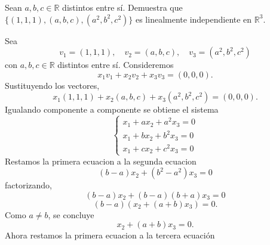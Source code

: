\documentclass[12pt,a4paper]{article}
\begin{document}
    \begin{mdframed}[style=mdbluebox,frametitle={Ejercicio 5}]
        Sean $a,b,c\in\mathbb{R}$ distintos entre sí. Demuestra que
        $\{(1,1,1),(a,b,c),(a^{2},b^{2},c^{2})\}$ es linealmente independiente
        en $\mathbb{R}^{3}$.
    \end{mdframed}

    \begin{solucion}
        Sea
        \begin{equation*}
            v_{1}=(1,1,1),\quad v_{2}=(a,b,c), \quad v_{3}=(a^{2},b^{2},c^{2})
        \end{equation*}
        con $a,b,c\in\mathbb{R}$ distintos entre sí. Consideremos
        \begin{equation*}
            x_{1}v_{1}+x_{2}v_{2}+x_{3}v_{3}=(0,0,0).
        \end{equation*}
        Sustituyendo los vectores,
        \begin{equation*}
            x_{1}(1,1,1)+x_{2}(a,b,c)+x_{3}(a^{2},b^{2},c^{2})=(0,0,0).
        \end{equation*}
        Igualando componente a componente se obtiene el sistema
        \begin{equation*}
            \begin{cases}
                x_{1}+ax_{2}+a^{2}x_{3}=0\\
                x_{1}+bx_{2}+b^{2}x_{3}=0\\
                x_{1}+cx_{2}+c^{2}x_{3}=0
            \end{cases}
        \end{equation*}
        Restamos la primera ecuacion a la segunda ecuacion
        \begin{equation*}
            (b-a)x_{2}+(b^{2}-a^{2})x_{3}=0
        \end{equation*}
        factorizando,
        \begin{equation*}
            (b-a)x_{2}+(b-a)(b+a)x_{3}=0
        \end{equation*}
        \begin{equation*}
            (b-a)(x_{2}+(a+b)x_{3})=0.
        \end{equation*}
        Como $a\neq b$, se concluye
        \begin{equation*}
            x_{2}+(a+b)x_{3}=0.
        \end{equation*}
        Ahora restamos la primera ecuacion a la tercera ecuación
        \begin{equation*}

\end{equation*}
\end{solucion}
\end{document}

